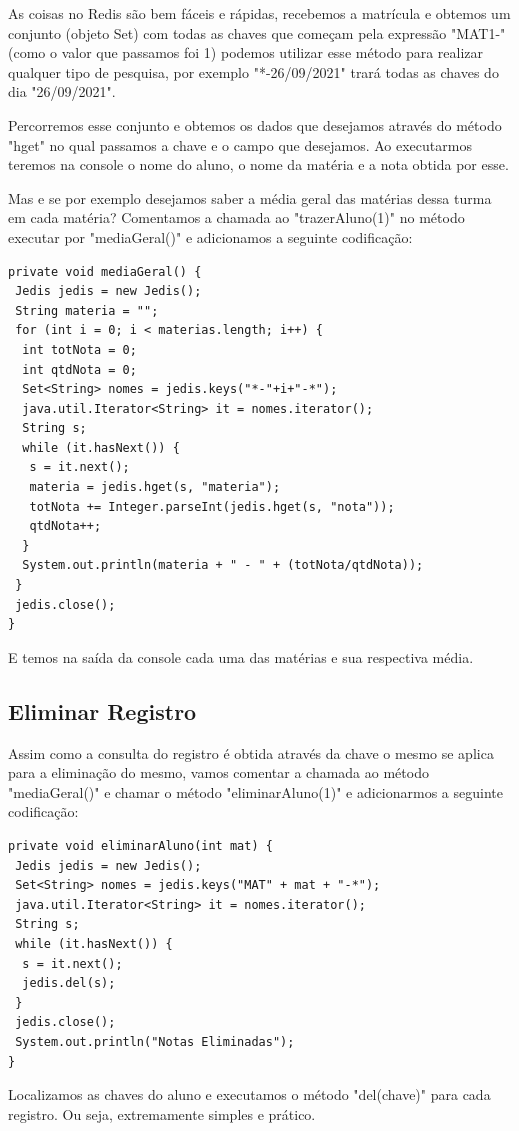As coisas no Redis são bem fáceis e rápidas, recebemos a matrícula e obtemos um conjunto (objeto Set) com todas as chaves que começam pela expressão "MAT1-" (como o valor que passamos foi 1) podemos utilizar esse método para realizar qualquer tipo de pesquisa, por exemplo "*-26/09/2021" trará todas as chaves do dia "26/09/2021". 

Percorremos esse conjunto e obtemos os dados que desejamos através do método "hget" no qual passamos a chave e o campo que desejamos. Ao executarmos teremos na console o nome do aluno, o nome da matéria e a nota obtida por esse.

Mas e se por exemplo desejamos saber a média geral das matérias dessa turma em cada matéria? Comentamos a chamada ao "trazerAluno(1)" no método executar por "mediaGeral()" e adicionamos a seguinte codificação:
\begin{lstlisting}[]
private void mediaGeral() {
 Jedis jedis = new Jedis();
 String materia = "";
 for (int i = 0; i < materias.length; i++) { 
  int totNota = 0;
  int qtdNota = 0;
  Set<String> nomes = jedis.keys("*-"+i+"-*");
  java.util.Iterator<String> it = nomes.iterator();
  String s;
  while (it.hasNext()) {
   s = it.next();
   materia = jedis.hget(s, "materia");
   totNota += Integer.parseInt(jedis.hget(s, "nota"));
   qtdNota++;
  }
  System.out.println(materia + " - " + (totNota/qtdNota));
 }
 jedis.close();
}	
\end{lstlisting}

E temos na saída da console cada uma das matérias e sua respectiva média.

\subsection{Eliminar Registro}
Assim como a consulta do registro é obtida através da chave o mesmo se aplica para a eliminação do mesmo, vamos comentar a chamada ao método "mediaGeral()" e chamar o método "eliminarAluno(1)" e adicionarmos a seguinte  codificação:
\begin{lstlisting}[]
private void eliminarAluno(int mat) {
 Jedis jedis = new Jedis();
 Set<String> nomes = jedis.keys("MAT" + mat + "-*");
 java.util.Iterator<String> it = nomes.iterator();
 String s;
 while (it.hasNext()) {
  s = it.next();
  jedis.del(s);
 }
 jedis.close();
 System.out.println("Notas Eliminadas");
} 	
\end{lstlisting}

Localizamos as chaves do aluno e executamos o método "del(chave)" para cada registro. Ou seja, extremamente simples e prático.

